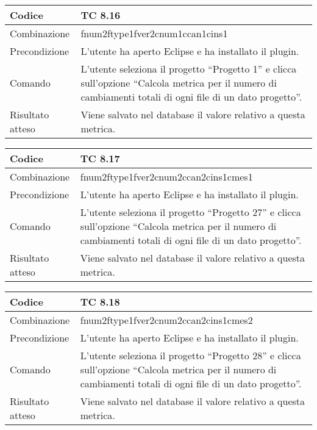 \begin{table}[ht]
\begin{tabular}{|p{3cm}|p{9cm}|}
\hline
\cellcolor{lightgray}Codice				& TC 8.16								\\
\hline
\cellcolor{lightgray}Combinazione		& fnum2ftype1fver2cnum1ccan1cins1									\\
\hline
\cellcolor{lightgray}Precondizione		& L'utente ha aperto Eclipse e ha installato il plugin.		\\
\hline
\cellcolor{lightgray}Comando			& L'utente seleziona il progetto ``Progetto 1''  e clicca sull'opzione ``Calcola metrica per il numero di cambiamenti totali di ogni file di un dato progetto''.	\\
\hline
\cellcolor{lightgray}Risultato atteso	& Viene salvato nel database il valore relativo a questa metrica.\\
\hline
\end{tabular}
\end{table}

\begin{table}[ht]
\begin{tabular}{|p{3cm}|p{9cm}|}
\hline
\cellcolor{lightgray}Codice				& TC 8.17								\\
\hline
\cellcolor{lightgray}Combinazione		& fnum2ftype1fver2cnum2ccan2cins1cmes1									\\
\hline
\cellcolor{lightgray}Precondizione		& L'utente ha aperto Eclipse e ha installato il plugin.		\\
\hline
\cellcolor{lightgray}Comando			& L'utente seleziona il progetto ``Progetto 27''  e clicca sull'opzione ``Calcola metrica per il numero di cambiamenti totali di ogni file di un dato progetto''.	\\
\hline
\cellcolor{lightgray}Risultato atteso	& Viene salvato nel database il valore relativo a questa metrica.\\
\hline
\end{tabular}
\end{table}

\begin{table}[ht]
\begin{tabular}{|p{3cm}|p{9cm}|}
\hline
\cellcolor{lightgray}Codice				& TC 8.18								\\
\hline
\cellcolor{lightgray}Combinazione		& fnum2ftype1fver2cnum2ccan2cins1cmes2									\\
\hline
\cellcolor{lightgray}Precondizione		& L'utente ha aperto Eclipse e ha installato il plugin.		\\
\hline
\cellcolor{lightgray}Comando			& L'utente seleziona il progetto ``Progetto 28''  e clicca sull'opzione ``Calcola metrica per il numero di cambiamenti totali di ogni file di un dato progetto''.	\\
\hline
\cellcolor{lightgray}Risultato atteso	& Viene salvato nel database il valore relativo a questa metrica.\\
\hline
\end{tabular}
\end{table}

